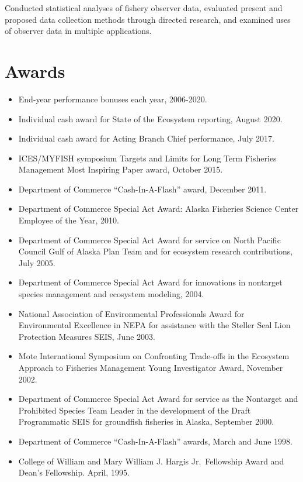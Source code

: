 \documentclass[11pt, a4paper]{awesome-cv}
\providecommand{\tightlist}{%
	\setlength{\itemsep}{0pt}\setlength{\parskip}{0pt}}
\begin{document}
Conducted statistical analyses of fishery observer data, evaluated
present and proposed data collection methods through directed research,
and examined uses of observer data in multiple applications.

\hypertarget{awards}{%
\section{Awards}\label{awards}}

\begin{itemize}
\tightlist
\item
  End-year performance bonuses each year, 2006-2020.
\item
  Individual cash award for State of the Ecosystem reporting, August
  2020.
\item
  Individual cash award for Acting Branch Chief performance, July 2017.
\item
  ICES/MYFISH symposium Targets and Limits for Long Term Fisheries
  Management Most Inspiring Paper award, October 2015.
\item
  Department of Commerce ``Cash-In-A-Flash'' award, December 2011.
\item
  Department of Commerce Special Act Award: Alaska Fisheries Science
  Center Employee of the Year, 2010.
\item
  Department of Commerce Special Act Award for service on North Pacific
  Council Gulf of Alaska Plan Team and for ecosystem research
  contributions, July 2005.
\item
  Department of Commerce Special Act Award for innovations in nontarget
  species management and ecosystem modeling, 2004.
\item
  National Association of Environmental Professionals Award for
  Environmental Excellence in NEPA for assistance with the Steller Seal
  Lion Protection Measures SEIS, June 2003.
\item
  Mote International Symposium on Confronting Trade-offs in the
  Ecosystem Approach to Fisheries Management Young Investigator Award,
  November 2002.
\item
  Department of Commerce Special Act Award for service as the Nontarget
  and Prohibited Species Team Leader in the development of the Draft
  Programmatic SEIS for groundfish fisheries in Alaska, September 2000.
\item
  Department of Commerce ``Cash-In-A-Flash'' awards, March and June
  1998.
\item
  College of William and Mary William J. Hargis Jr.~Fellowship Award and
  Dean's Fellowship. April, 1995.
\end{itemize}
\end{document}

